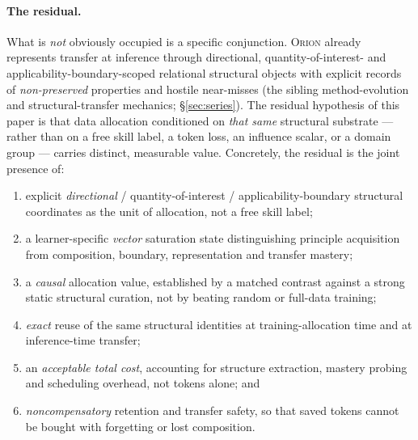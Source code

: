 \documentclass[11pt]{article}
\newcommand{\RAKL}{\textsc{Orion}}
\begin{document}
\paragraph{The residual.}
What is \emph{not} obviously occupied is a specific conjunction. \RAKL{} already represents transfer at inference through directional, quantity-of-interest- and applicability-boundary-scoped relational structural objects with explicit records of \emph{non-preserved} properties and hostile near-misses (the sibling method-evolution and structural-transfer mechanics; \S\ref{sec:series}). The residual hypothesis of this paper is that data allocation conditioned on \emph{that same} structural substrate --- rather than on a free skill label, a token loss, an influence scalar, or a domain group --- carries distinct, measurable value. Concretely, the residual is the joint presence of:
\begin{enumerate}[leftmargin=1.4em,itemsep=1pt]
\item explicit \emph{directional} / quantity-of-interest / applicability-boundary structural coordinates as the unit of allocation, not a free skill label;
\item a learner-specific \emph{vector} saturation state distinguishing principle acquisition from composition, boundary, representation and transfer mastery;
\item a \emph{causal} allocation value, established by a matched contrast against a strong static structural curation, not by beating random or full-data training;
\item \emph{exact} reuse of the same structural identities at training-allocation time and at inference-time transfer;
\item an \emph{acceptable total cost}, accounting for structure extraction, mastery probing and scheduling overhead, not tokens alone; and
\item \emph{noncompensatory} retention and transfer safety, so that saved tokens cannot be bought with forgetting or lost composition.
\end{enumerate}
\end{document}
